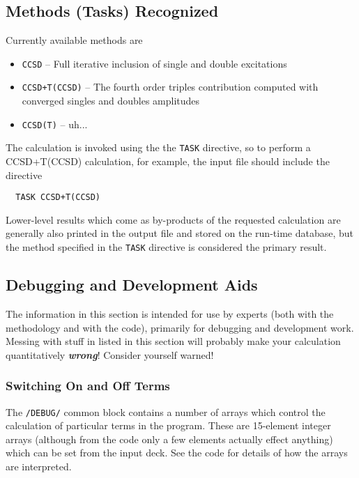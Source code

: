 \subsection{Methods (Tasks) Recognized}

Currently available methods are
\begin{itemize}
\item \verb+CCSD+ -- Full iterative inclusion of single and double
excitations
\item \verb=CCSD+T(CCSD)= -- The fourth order triples contribution computed with
converged singles and doubles amplitudes
\item \verb=CCSD(T)= -- uh...
\end{itemize}

The calculation is invoked using the the \verb+TASK+ directive, so to
perform a CCSD+T(CCSD) calculation, for example, the input file should
include the directive
\begin{verbatim}
  TASK CCSD+T(CCSD)
\end{verbatim}

Lower-level results which come as by-products of the requested
calculation are generally also printed in the output file and stored
on the run-time database, but the method specified in the \verb+TASK+
directive is considered the primary result.

\subsection{Debugging and Development Aids}

The information in this section is intended for use by experts (both
with the methodology and with the code), primarily for debugging and
development work.  Messing with stuff in listed in this section will
probably make your calculation quantitatively {\em\bf wrong}\/!
Consider yourself warned!

\subsubsection{Switching On and Off Terms}

The \verb+/DEBUG/+ common block contains a number of arrays which
control the calculation of particular terms in the program.  These are
15-element integer arrays (although from the code only a few elements
actually effect anything) which can be set from the input deck.  See
the code for details of how the arrays are interpreted.  

